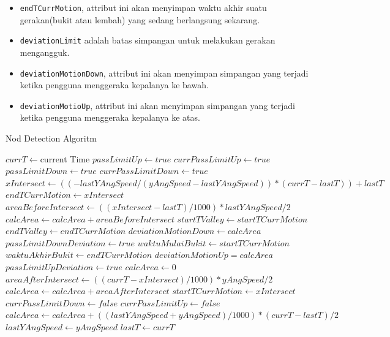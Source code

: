 \documentclass[a4paper,twoside]{article}
\begin{document}
\begin{enumerate}
\begin{itemize}
	\item \texttt{endTCurrMotion}, attribut ini akan menyimpan waktu akhir suatu gerakan(bukit atau lembah) yang sedang berlangsung sekarang.
	\item \texttt{deviationLimit} adalah batas simpangan untuk melakukan gerakan mengangguk.
	\item \texttt{deviationMotionDown}, attribut ini akan menyimpan simpangan yang terjadi ketika pengguna menggeraka kepalanya ke bawah. 
	\item \texttt{deviationMotioUp}, attribut ini akan menyimpan simpangan yang terjadi ketika pengguna menggeraka kepalanya ke atas. 
\end{itemize}
\begin{algorithm}
	\caption{Nod Detection Algoritm}
	\label{alg:algoritma-pendeteksi-gerakan-mengangguk}
	\begin{algorithmic}[1]
		\State $currT \gets $current Time 
			\State $passLimitUp \gets true$
			\State $currPassLimitUp \gets true$
			\State $passLimitDown \gets true$
			\State $currPassLimitDown \gets true$
		\EndIf
			\State $xIntersect \gets ((-lastYAngSpeed / (yAngSpeed - lastYAngSpeed)) * (currT - lastT))+lastT$
			\State $endTCurrMotion \gets xIntersect$
			\State $areaBeforeIntersect \gets ((xIntersect - lastT) / 1000) * lastYAngSpeed / 2$
			\State $calcArea \gets calcArea + areaBeforeIntersect$
				\State $startTValley \gets startTCurrMotion$
				\State $endTValley \gets endTCurrMotion$
				\State $deviationMotionDown \gets calcArea$
					\State $passLimitDownDeviation \gets true$
				\EndIf
				\State $waktuMulaiBukit \gets startTCurrMotion$
				\State $waktuAkhirBukit \gets endTCurrMotion$
				\State $deviationMotionUp = calcArea$
					\State $passLimitUpDeviation \gets true$
				\EndIf
			\EndIf
			\State $calcArea \gets 0$
			\State $areaAfterIntersect \gets ((currT - xIntersect) / 1000) * yAngSpeed / 2$ 
			\State $calcArea \gets calcArea + areaAfterIntersect$ 
			\State $startTCurrMotion \gets xIntersect$ 
			\State $currPassLimitDown \gets false$ 
			\State $currPassLimitUp \gets false$ 
		\Else 
			\State $calcArea \gets calcArea + ((lastYAngSpeed + yAngSpeed) / 1000) * (currT - lastT) / 2$
		\EndIf
		\State $lastYAngSpeed \gets yAngSpeed$
		\State $lastT \gets currT$
		

\end{algorithmic}
\end{algorithm}
\end{enumerate}
\end{document}
